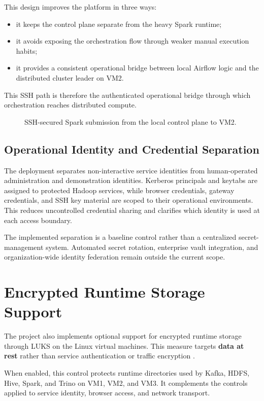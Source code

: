 This design improves the platform in three ways:
\begin{itemize}
    \item it keeps the control plane separate from the heavy Spark runtime;
    \item it avoids exposing the orchestration flow through weaker manual execution habits;
    \item it provides a consistent operational bridge between local Airflow logic and the distributed cluster leader on VM2.
\end{itemize}

This SSH path is therefore the authenticated operational bridge through which orchestration reaches distributed compute.

\begin{figure}[H]
    \centering
    
    \caption{SSH-secured Spark submission from the local control plane to VM2.}
    \label{fig:chapter7-remote-spark-ssh}
\end{figure}

\subsection*{Operational Identity and Credential Separation}
The deployment separates non-interactive service identities from human-operated administration and demonstration identities. Kerberos principals and keytabs are assigned to protected Hadoop services, while browser credentials, gateway credentials, and SSH key material are scoped to their operational environments. This reduces uncontrolled credential sharing and clarifies which identity is used at each access boundary.

The implemented separation is a baseline control rather than a centralized secret-management system. Automated secret rotation, enterprise vault integration, and organization-wide identity federation remain outside the current scope.

\section{Encrypted Runtime Storage Support}
The project also implements optional support for encrypted runtime storage through LUKS on the Linux virtual machines. This measure targets \textbf{data at rest} rather than service authentication or traffic encryption \cite{cryptsetup_docs}.

When enabled, this control protects runtime directories used by Kafka, HDFS, Hive, Spark, and Trino on VM1, VM2, and VM3. It complements the controls applied to service identity, browser access, and network transport.

